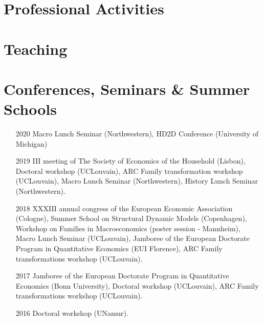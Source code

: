 \documentclass[10pt]{article} %
\begin{document}
\section{Professional Activities}




\section{Teaching}




\section{Conferences, Seminars \& Summer Schools}
\begin{itemize}
\item[2020] Macro Lunch Seminar (Northwestern), HD2D Conference (University of Michigan)
\item[2019] III meeting of The Society of Economics of the Household (Lisbon), Doctoral workshop (UCLouvain), ARC Family transformation workshop (UCLouvain), Macro Lunch Seminar (Northwestern), History Lunch Seminar (Northwestern).
\item[2018] XXXIII annual congress of the European Economic Association (Cologne), Summer School on Structural Dynamic Models (Copenhagen), Workshop on Families in Macroeconomics (poster session - Mannheim), Macro Lunch Seminar (UCLouvain), Jamboree of the European Doctorate Program in Quantitative Economics (EUI Florence), ARC Family transformations workshop (UCLouvain).
\item[2017] Jamboree of the European Doctorate Program in Quantitative Economics (Bonn University), Doctoral workshop (UCLouvain), ARC Family transformations workshop (UCLouvain).
\item[2016] Doctoral workshop (UNamur).
\end{itemize}
\end{document}
